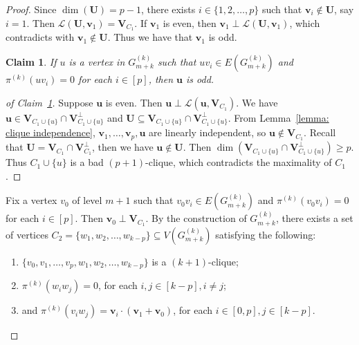 \documentclass[
final
]{dmtcs-episciences}
\newtheorem{claim}[theorem]{Claim}
\begin{document}
\begin{proof}
    Since  $\dim(\textbf{U})= p-1$, there exists $i \in \{1,2,\ldots, p\}$ such that $\mathbf{v}_i \notin \mathbf{U}$, say $i=1$.
   Then $\mathcal{L}(\textbf{U},\textbf{v}_1)=\textbf{V}_{C_1}$.
   If $\mathbf{v}_1$ is even, then $\mathbf{v}_1 \perp \mathcal{L}(\textbf{U},\textbf{v}_1)$, which contradicts with $\mathbf{v}_1 \notin \textbf{U}$. Thus we have that $\textbf{v}_1$ is odd. 

\begin{claim}\label{C zero neighbor is odd}
    If $u$ is a vertex in $G^{(k)}_{m+k}$ such that $uv_i\in E(G^{(k)}_{m+k})$ and $\pi^{(k)}(uv_i)=0$ for each $i\in[p]$, then $\textbf{u}$ is odd.
\end{claim}

\begin{proof}[of Claim~\ref{C zero neighbor is odd}]
Suppose $\textbf{u}$ is even. Then $\textbf{u}\perp \mathcal{L}(\textbf{u},\textbf{V}_{C_1})$. We have $\textbf{u}\in \textbf{V}_{C_1\cup\{u\}}\cap \textbf{V}_{C_1\cup\{u\}}^{\perp}$ and $\textbf{U}\subseteq \textbf{V}_{C_1\cup\{u\}}\cap \textbf{V}_{C_1\cup\{u\}}^{\perp}$. 
From Lemma~\ref{lemma: clique independence}, $\mathbf{v}_1, \ldots, \mathbf{v}_p, \mathbf{u}$ are linearly independent, so $\mathbf{u} \notin \textbf{V}_{C_1}$.
Recall that $\mathbf{U} = \mathbf{V}_{C_1} \cap \mathbf{V}_{C_1}^{\perp}$, then we have $\mathbf{u} \notin \mathbf{U}$.
Then $\dim(\textbf{V}_{C_1\cup\{u\}}\cap \textbf{V}_{C_1\cup\{u\}}^{\perp})\ge p$. Thus $ C_1\cup \{u\}$ is a bad $(p+1)$-clique, which contradicts the maximality of $C_1$. %
\end{proof}
\vspace{.2cm}

Fix a vertex $v_0$ of level $m+1$ such that $v_0v_i\in E(G^{(k)}_{m+k})$ and $\pi^{(k)}(v_0v_i)=0$ for each $i\in[p]$. Then $\mathbf{v}_0 \perp \mathbf{V}_{C_1}$.
By the construction of $G^{(k)}_{m+k}$, there exists a set of vertices $C_2=\{w_1,w_2,\dots, w_{k-p}\} \subseteq V(G^{(k)}_{m+k})$ satisfying the following:
\begin{enumerate}
    \item $\{v_0,v_1,\ldots,v_p,w_1,w_2,\ldots, w_{k-p}\}$ is a $(k+1)$-clique;
    \item $\pi^{(k)}(w_i w_j)=0$, for each $i,j\in[k-p], i\neq j$;
    \item and $\pi^{(k)}(v_i w_j)=\textbf{v}_i \cdot (\textbf{v}_1+\textbf{v}_0)$, for each $i\in[0,p],j\in[k-p]$.
\end{enumerate}


\end{proof}
\end{document}

